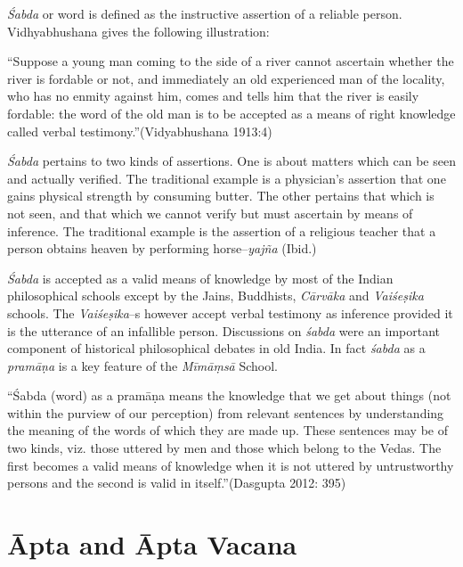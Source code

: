 \textit{Śabda} or word is defined as the instructive assertion of a reliable person. Vidhyabhushana gives the following illustration:

\newpage

\begin{myquote}
“Suppose a young man coming to the side of a river cannot ascertain whether the river is fordable or not, and immediately an old experienced man of the locality, who has no enmity against him, comes and tells him that the river is easily fordable: the word of the old man is to be accepted as a means of right knowledge called verbal testimony.”(Vidyabhushana 1913:4)
\end{myquote}

\textit{Śabda} pertains to two kinds of assertions. One is about matters which can be seen and actually verified. The traditional example is a physician’s assertion that one gains physical strength by consuming butter. The other pertains that which is not seen, and that which we cannot verify but must ascertain by means of inference. The traditional example is the assertion of a religious teacher that a person obtains heaven by performing horse–\textit{yajña} (Ibid.)

\textit{Śabda} is accepted as a valid means of knowledge by most of the Indian philosophical schools except by the Jains, Buddhists, \textit{Cārvāka} and \textit{Vaiśeṣika} schools. The \textit{Vaiśeṣika}–s however accept verbal testimony as inference provided it is the utterance of an infallible person. Discussions on \textit{śabda} were an important component of historical philosophical debates in old India. In fact \textit{śabda} as a \textit{pramāṇa} is a key feature of the \textit{Mīmāṃsā} School.

\begin{myquote}
“Śabda (word) as a pramāṇa means the knowledge that we get about things (not within the purview of our perception) from relevant sentences by understanding the meaning of the words of which they are made up. These sentences may be of two kinds, viz. those uttered by men and those which belong to the Vedas. The first becomes a valid means of knowledge when it is not uttered by untrustworthy persons and the second is valid in itself.”(Dasgupta 2012: 395)
\end{myquote}


\section*{Āpta and Āpta Vacana}

